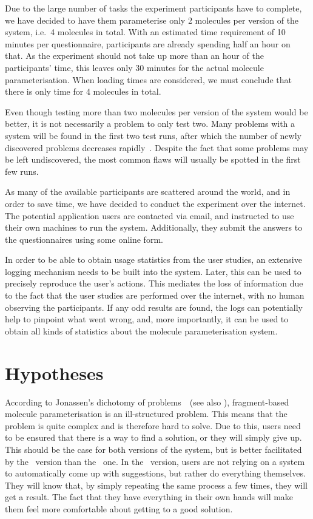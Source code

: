 Due to the large number of tasks the experiment participants have to complete, we have decided to have them parameterise only 2 molecules per version of the system, i.e.\ 4 molecules in total. With an estimated time requirement of 10 minutes per questionnaire, participants are already spending half an hour on that. As the experiment should not take up more than an hour of the participants' time, this leaves only 30 minutes for the actual molecule parameterisation. When loading times are considered, we must conclude that there is only time for 4 molecules in total.

Even though testing more than two molecules per version of the system would be better, it is not necessarily a problem to only test two. Many problems with a system will be found in the first two test runs, after which the number of newly discovered problems decreases rapidly~\cite{krug2006dont, nielsen2000you}. Despite the fact that some problems may be left undiscovered, the most common flaws will usually be spotted in the first few runs.

As many of the available participants are scattered around the world, and in order to save time, we have decided to conduct the experiment over the internet. The potential application users are contacted via email, and instructed to use their own machines to run the system. Additionally, they submit the answers to the questionnaires using some online form.

In order to be able to obtain usage statistics from the user studies, an extensive logging mechanism needs to be built into the system. Later, this can be used to precisely reproduce the user's actions. This mediates the loss of information due to the fact that the user studies are performed over the internet, with no human observing the participants. If any odd results are found, the logs can potentially help to pinpoint what went wrong, and, more importantly, it can be used to obtain all kinds of statistics about the molecule parameterisation system.



\section{Hypotheses}
According to Jonassen's dichotomy of problems~\cite{jonassen2000toward}~(see also ), fragment-based molecule parameterisation is an ill-structured problem. This means that the problem is quite complex and is therefore hard to solve. Due to this, users need to be ensured that there is a way to find a solution, or they will simply give up. This should be the case for both versions of the system, but is better facilitated by the \IDa\ version than the \IDb\ one. In the \IDa\ version, users are not relying on a system to automatically come up with suggestions, but rather do everything themselves. They will know that, by simply repeating the same process a few times, they will get a result. The fact that they have everything in their own hands will make them feel more comfortable about getting to a good solution.

